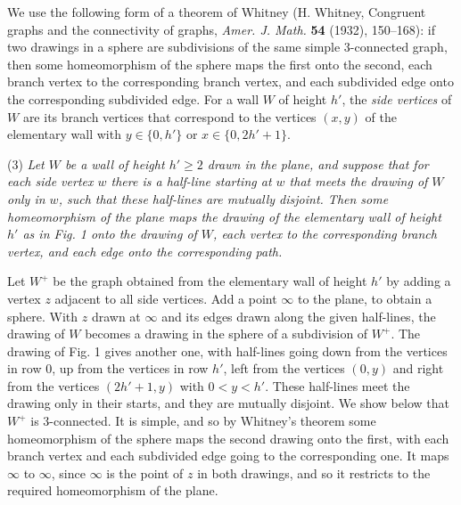 {We use the following form of a theorem of Whitney (H. Whitney, Congruent graphs and the connectivity of graphs, \textit{Amer. J. Math.} \textbf{54} (1932), 150--168): if two drawings in a sphere are subdivisions of the same simple 3-connected graph, then some homeomorphism of the sphere maps the first onto the second, each branch vertex to the corresponding branch vertex, and each subdivided edge onto the corresponding subdivided edge. For a wall $W$ of height $h'$, the \textit{side vertices} of $W$ are its branch vertices that correspond to the vertices $(x, y)$ of the elementary wall with $y \in \{0, h'\}$ or $x \in \{0, 2h' + 1\}$.

\hspace*{12pt}(3) \textit{Let $W$ be a wall of height $h' \ge 2$ drawn in the plane, and suppose that for each side vertex $w$ there is a half-line starting at $w$ that meets the drawing of $W$ only in $w$, such that these half-lines are mutually disjoint. Then some homeomorphism of the plane maps the drawing of the elementary wall of height $h'$ as in Fig. 1 onto the drawing of $W$, each vertex to the corresponding branch vertex, and each edge onto the corresponding path.}

Let $W^+$ be the graph obtained from the elementary wall of height $h'$ by adding a vertex $z$ adjacent to all side vertices. Add a point $\infty$ to the plane, to obtain a sphere. With $z$ drawn at $\infty$ and its edges drawn along the given half-lines, the drawing of $W$ becomes a drawing in the sphere of a subdivision of $W^+$. The drawing of Fig. 1 gives another one, with half-lines going down from the vertices in row $0$, up from the vertices in row $h'$, left from the vertices $(0, y)$ and right from the vertices $(2h' + 1, y)$ with $0 < y < h'$. These half-lines meet the drawing only in their starts, and they are mutually disjoint. We show below that $W^+$ is 3-connected. It is simple, and so by Whitney's theorem some homeomorphism of the sphere maps the second drawing onto the first, with each branch vertex and each subdivided edge going to the corresponding one. It maps $\infty$ to $\infty$, since $\infty$ is the point of $z$ in both drawings, and so it restricts to the required homeomorphism of the plane.

}
